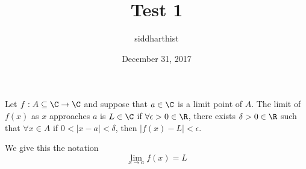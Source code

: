 \documentclass{article}
\begin{document}
\title{Test 1}
\author{siddharthist}
\date{December 31, 2017}
\maketitle
\begin{definition}
	Let $f:A\subseteq\C\to\C$ and suppose that $a\in\C$ is a limit point of $A$.
  The limit of $f(x)$ as $x$ approaches $a$ is $L\in\C$ if $\forall \epsilon >
  0\in \R$, there exists $\delta>0\in \R$ such that $\forall x\in A$ if
  $0<|x-a|<\delta$, then $|f(x)-L|<\epsilon$.

  We give this the notation
  \begin{equation*}
    \lim_{x\to a} f(x)=L
  \end{equation*}
\end{definition}
\end{document}
